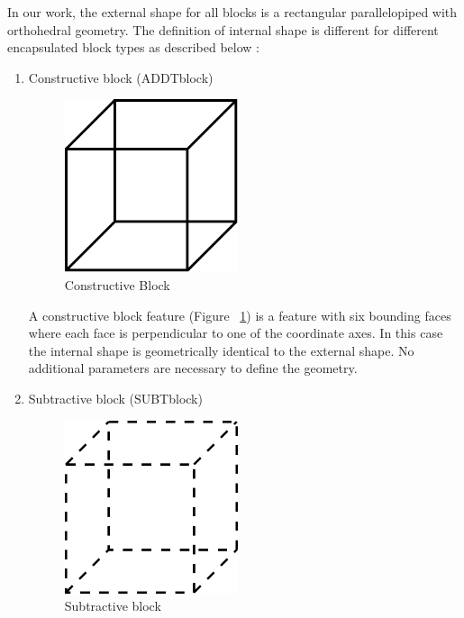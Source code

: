 	In our work, the external shape for all blocks is a rectangular 
	parallelopiped with orthohedral geometry.
	The definition of internal shape is different for different encapsulated
	block types as described below :
    \begin{enumerate}

    \item
    Constructive block (ADDTblock)

        \begin{figure}[htbp]
            \hspace{4cm}
            \includegraphics[width=2.0in,height=2.0in]{ADDBLK.pdf}
            \caption{Constructive Block}
            \label{addblk}
        \end{figure}

        A constructive block feature (Figure ~\ref{addblk}) is a feature
        with six bounding faces
        where each face is perpendicular to one of the coordinate axes. In this
        case the internal shape is geometrically identical to the external 
		shape. No additional parameters are necessary to define the geometry.

    \item
    Subtractive block  (SUBTblock)

        \begin{figure}[htbp]
            \hspace{4cm}           
           \includegraphics[width=2.0in,height=2.0in]{SUBBLK.pdf}
            \caption{Subtractive block}
            \label{subblk}
        \end{figure}


\end{enumerate}
